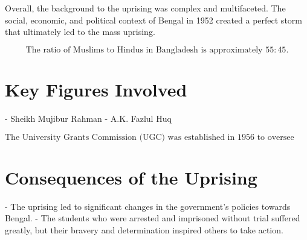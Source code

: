 Overall, the background to the uprising was complex and multifaceted. The social, economic, and political context of Bengal in 1952 created a perfect storm that ultimately led to the mass uprising.

\begin{equation}
\text{The ratio of Muslims to Hindus in Bangladesh is approximately } 55:45.
\end{equation}

\section*{Key Figures Involved}

- Sheikh Mujibur Rahman
- A.K. Fazlul Huq

\begin{equation}
\text{The University Grants Commission (UGC) was established in 1956 to oversee education in Bengal.}
\end{equation}

\section*{Consequences of the Uprising}

- The uprising led to significant changes in the government's policies towards Bengal.
- The students who were arrested and imprisoned without trial suffered greatly, but their bravery and determination inspired others to take action.